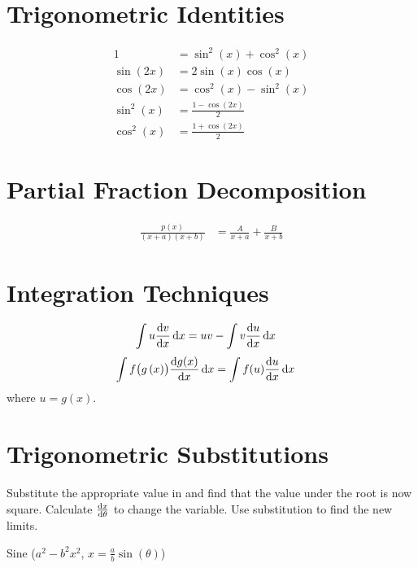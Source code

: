 \documentclass{article}
\begin{document}
\begin{multicols}{3}
    \section*{Trigonometric Identities}
    \begin{align*}
        1                        & = \sin^2{\left( x \right)} + \cos^2{\left( x \right)} \\
        \sin{\left( 2x \right)}  & = 2\sin{\left( x \right)}\cos{\left( x \right)}       \\
        \cos{\left( 2x \right)}  & = \cos^2{\left( x \right)} - \sin^2{\left( x \right)} \\
        \sin^2{\left( x \right)} & = \frac{1-\cos{\left( 2x \right)}}{2}                 \\
        \cos^2{\left( x \right)} & = \frac{1+\cos{\left( 2x \right)}}{2}
    \end{align*}
    \section*{Partial Fraction Decomposition}
    \begin{align*}
        \frac{p(x)}{(x+a)(x+b)} & = \frac{A}{x+a} + \frac{B}{x+b}
    \end{align*}
    \section*{Integration Techniques}
    \begin{align*}
        \int u \dv{v}{x}\dd{x} & = uv - \int v \dv{u}{x}\dd{x}
    \end{align*}
    \begin{align*}
        \int f\bigl(g\left( x \right)\bigr)\dv{g(x)}{x} \dd{x} & = \int f(u) \dv{u}{x}\dd{x}
    \end{align*}
    where $u = g(x)$.
    \section*{Trigonometric Substitutions}
    Substitute the appropriate value in and find that the value under the root is now square.
    Calculate $\dv{x}{\theta}$ to change the variable.
    Use substitution to find the new limits.

    Sine ($a^2-b^2x^2$, $x=\frac{a}{b}\sin{\left( \theta \right)}$)
    \begin{center}
    \end{center}


\end{multicols}
\end{document}
